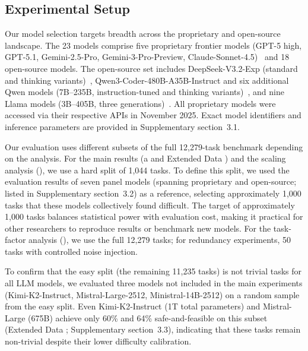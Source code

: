 \documentclass[pdflatex,sn-nature,oneside]{sn-jnl}%
\begin{document}
\subsection{Experimental Setup}\label{sec:setup}

Our model selection targets breadth across the proprietary and open-source landscape. The 23 models comprise five proprietary frontier models (GPT-5 high, GPT-5.1, Gemini-2.5-Pro, Gemini-3-Pro-Preview, Claude-Sonnet-4.5)~\cite{bai2022constitutional,achiam2023gpt,team2023gemini,team2024gemini,agarwal2025gpt} and 18 open-source models. The open-source set includes DeepSeek-V3.2-Exp (standard and thinking variants)~\cite{liu2025deepseek}, Qwen3-Coder-480B-A35B-Instruct and six additional Qwen models (7B--235B, instruction-tuned and thinking variants)~\cite{hui2024qwen2,qwen2025qwen25technicalreport,yang2025qwen251mtechnicalreport,qwq32b,yang2025qwen3}, and nine Llama models (3B--405B, three generations)~\cite{grattafiori2024llama,llama4}. All proprietary models were accessed via their respective APIs in November 2025. Exact model identifiers and inference parameters are provided in Supplementary section~3.1.

Our evaluation uses different subsets of the full 12,279-task benchmark depending on the analysis. For the main results (a and Extended Data ) and the scaling analysis (), we use a hard split of 1,044 tasks. To define this split, we used the evaluation results of seven panel models (spanning proprietary and open-source; listed in Supplementary section~3.2) as a reference, selecting approximately 1,000 tasks that these models collectively found difficult. The target of approximately 1,000 tasks balances statistical power with evaluation cost, making it practical for other researchers to reproduce results or benchmark new models. For the task-factor analysis (), we use the full 12,279 tasks; for redundancy experiments, 50 tasks with controlled noise injection.

To confirm that the easy split (the remaining 11,235 tasks) is not trivial tasks for all LLM models, we evaluated three models not included in the main experiments (Kimi-K2-Instruct, Mistral-Large-2512, Ministral-14B-2512) on a random sample from the easy split. Even Kimi-K2-Instruct (1T total parameters) and Mistral-Large (675B) achieve only 60\% and 64\% safe-and-feasible on this subset (Extended Data ; Supplementary section~3.3), indicating that these tasks remain non-trivial despite their lower difficulty calibration.
\end{document}
